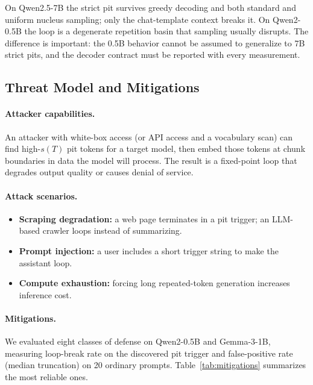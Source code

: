 \documentclass{article}
\begin{document}
On Qwen2.5-7B the strict pit survives greedy decoding and both standard and
uniform nucleus sampling; only the chat-template context breaks it. On
Qwen2-0.5B the loop is a degenerate repetition basin that sampling usually
disrupts. The difference is important: the 0.5B behavior cannot be assumed to
generalize to 7B strict pits, and the decoder contract must be reported with
every measurement.

\subsection{Threat Model and Mitigations}

\paragraph{Attacker capabilities.} An attacker with white-box access (or API
access and a vocabulary scan) can find high-$s(T)$ pit tokens for a target
model, then embed those tokens at chunk boundaries in data the model will
process. The result is a fixed-point loop that degrades output quality or
causes denial of service.

\paragraph{Attack scenarios.}
\begin{itemize}
\item \textbf{Scraping degradation:} a web page terminates in a pit trigger; an LLM-based crawler loops instead of summarizing.
\item \textbf{Prompt injection:} a user includes a short trigger string to make the assistant loop.
\item \textbf{Compute exhaustion:} forcing long repeated-token generation increases inference cost.
\end{itemize}

\paragraph{Mitigations.} We evaluated eight classes of defense on Qwen2-0.5B
and Gemma-3-1B, measuring loop-break rate on the discovered pit trigger and
false-positive rate (median truncation) on 20 ordinary prompts. Table~\ref{tab:mitigations}
summarizes the most reliable ones.
\end{document}
